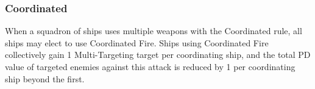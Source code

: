 \subsubsection{Coordinated}
When a squadron of ships uses multiple weapons with the Coordinated rule, all ships may elect to use Coordinated Fire. Ships using Coordinated Fire collectively gain 1 Multi-Targeting target per coordinating ship, and the total PD value of targeted enemies against this attack is reduced by 1 per coordinating ship beyond the first. 